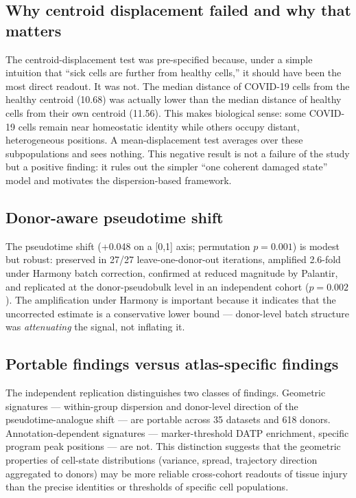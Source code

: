 \documentclass[11pt,a4paper]{article}
\begin{document}
\subsection{Why centroid displacement failed and why that matters}

The centroid-displacement test was pre-specified because, under a simple intuition
that ``sick cells are further from healthy cells,'' it should have been the most
direct readout. It was not. The median distance of COVID-19 cells from the healthy
centroid (10.68) was actually lower than the median distance of healthy cells from
their own centroid (11.56). This makes biological sense: some COVID-19 cells
remain near homeostatic identity while others occupy distant, heterogeneous
positions. A mean-displacement test averages over these subpopulations and sees
nothing. This negative result is not a failure of the study but a positive
finding: it rules out the simpler ``one coherent damaged state'' model and motivates
the dispersion-based framework.

\subsection{Donor-aware pseudotime shift}

The pseudotime shift (+0.048 on a [0,1] axis; permutation $p = 0.001$) is modest
but robust: preserved in 27/27 leave-one-donor-out iterations, amplified 2.6-fold
under Harmony batch correction, confirmed at reduced magnitude by Palantir, and
replicated at the donor-pseudobulk level in an independent cohort ($p = 0.002$).
The amplification under Harmony is important because it indicates that the
uncorrected estimate is a conservative lower bound --- donor-level batch structure
was \textit{attenuating} the signal, not inflating it.

\subsection{Portable findings versus atlas-specific findings}

The independent replication distinguishes two classes of findings. Geometric
signatures --- within-group dispersion and donor-level direction of the
pseudotime-analogue shift --- are portable across 35 datasets and 618 donors.
Annotation-dependent signatures --- marker-threshold DATP enrichment, specific
program peak positions --- are not. This distinction suggests that the geometric
properties of cell-state distributions (variance, spread, trajectory direction
aggregated to donors) may be more reliable cross-cohort readouts of tissue injury
than the precise identities or thresholds of specific cell populations.
\end{document}
